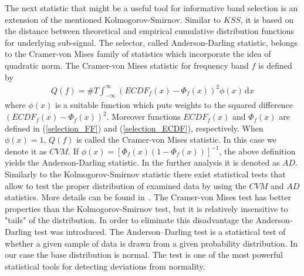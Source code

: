 The next statistic that might be a useful tool for informative band selection is an extension of the mentioned Kolmogorov-Smirnov. Similar to $KSS$, it is based on the distance between theoretical and empirical cumulative distribution functions for underlying sub-signal. The selector, called Anderson-Darling statistic, belongs to the Cramer-von Mises family of statistics which incorporate the idea of quadratic norm. The Cramer-von Mises statistic for frequency band $f$ is defined by~\cite{Burnecki2011293}
\begin{eqnarray}
Q(f)=\#T\int^{\infty}_{-\infty} \! \left(ECDF_{f}\left(x \right) - \Phi_f\left(x\right)\right)^2 \phi \left(x\right) \, \mathrm{d} x
\end{eqnarray}
where $\phi \left(x\right)$ is a suitable function which puts weights to the squared difference $\left(ECDF_{f}\left(x \right) - \Phi_f\left(x\right)\right)^2$. Moreover functions $ECDF_f(x)$ and $\Phi_f(x)$ are defined in (\ref{selection_FF}) and (\ref{selection_ECDF}), respectively. When $\phi(x)=1$, $Q(f)$ is called the Cramer-von Mises statistic. In this case we denote it as $CVM$. If $\phi\left(x\right)=\left[ \Phi_f\left(x\right) \left( 1-\Phi_f\left(x\right) \right) \right]^{-1}$, the above definition yields the Anderson-Darling statistic.  In the further analysis it is denoted as $AD$. Similarly to the Kolmogorov-Smirnov statistic there exist statistical tests that allow to test the proper distribution of examined data by using the $CVM$ and $AD$ statistics. More details can be found in~\cite{Anderson1952193,Anderson1954765,Burnecki2012}. The Cramer-von Mises test has better properties than the Kolmogorov-Smirnov test, but it is relatively insensitive to "tails" of the distribution. In order to eliminate this disadvantage the Anderson-Darling test was introduced. The Anderson--Darling test is a statistical test of whether a given sample of data is drawn from a given probability distribution. In our case the base distribution is normal. The test is one of the most powerful statistical tools for detecting deviations from normality.\\
